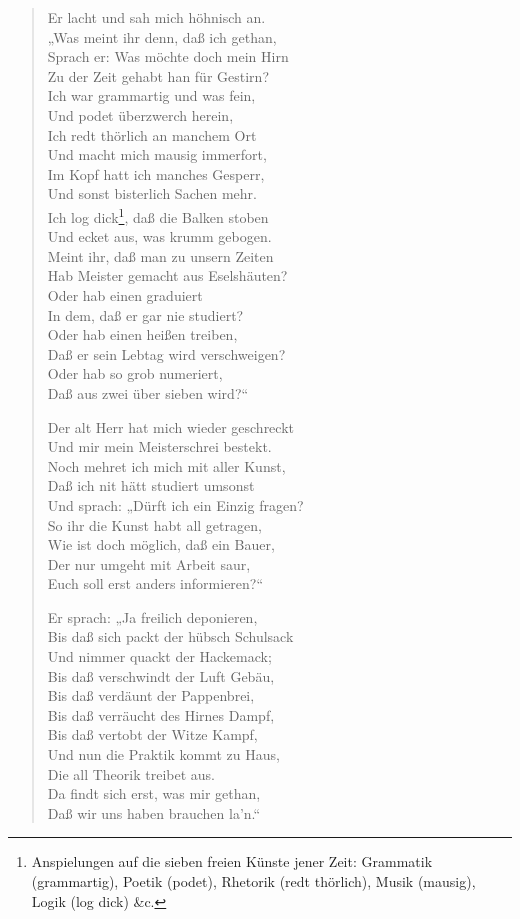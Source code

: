 \begin{verse}
Er lacht und sah mich höhnisch an.\\
„Was meint ihr denn, daß ich gethan,\\
Sprach er: Was möchte doch mein Hirn\\
Zu der Zeit gehabt han für Gestirn?\\
Ich war grammartig und was fein,\\
Und podet überzwerch herein,\\
Ich redt thörlich an manchem Ort\\
Und macht mich mausig immerfort,\\
Im Kopf hatt ich manches Gesperr,\\
Und sonst bisterlich Sachen mehr.\\
Ich log dick\footnote{Anspielungen auf die sieben freien Künste jener Zeit: Grammatik (grammartig), Poetik (podet), Rhetorik (redt thörlich), Musik (mausig), Logik (log dick) \&c.}, daß die Balken stoben\\
Und ecket aus, was krumm gebogen.\\
Meint ihr, daß man zu unsern Zeiten\\
Hab Meister gemacht aus Eselshäuten?\\
Oder hab einen graduiert\\
In dem, daß er gar nie studiert?\\
Oder hab einen heißen treiben,\\
Daß er sein Lebtag wird verschweigen?\\
Oder hab so grob numeriert,\\
Daß aus zwei über sieben wird?“

Der alt Herr hat mich wieder geschreckt\\
Und mir mein Meisterschrei bestekt.\\
Noch mehret ich mich mit aller Kunst,\\
Daß ich nit hätt studiert umsonst\\
Und sprach: „Dürft ich ein Einzig fragen?\\
So ihr die Kunst habt all getragen,\\
Wie ist doch möglich, daß ein Bauer,\\
Der nur umgeht mit Arbeit saur,\\
Euch soll erst anders informieren?“

Er sprach: „Ja freilich deponieren,\\
Bis daß sich packt der hübsch Schulsack\\
Und nimmer quackt der Hackemack;\\
Bis daß verschwindt der Luft Gebäu,\\
Bis daß verdäunt der Pappenbrei,\\
Bis daß verräucht des Hirnes Dampf,\\
Bis daß vertobt der Witze Kampf,\\
Und nun die Praktik kommt zu Haus,\\
Die all Theorik treibet aus.\\
Da findt sich erst, was mir gethan,\\
Daß wir uns haben brauchen la’n.“


\end{verse}
